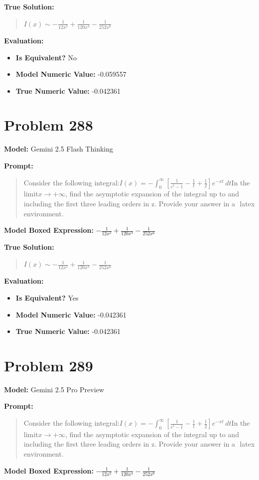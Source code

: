\documentclass{article}
\begin{document}
{\textbf{True Solution:}
\begin{quote}
$I(x) \sim -\frac{1}{12x^2} + \frac{1}{120x^4} - \frac{1}{252x^6}$
\end{quote}

\textbf{Evaluation:}
\begin{itemize}
\item \textbf{Is Equivalent?} No
\item \textbf{Model Numeric Value:} -0.059557
\item \textbf{True Numeric Value:} -0.042361
\end{itemize}
\vspace{1cm}
\section*{Problem 288}
\textbf{Model:} Gemini 2.5 Flash Thinking

\textbf{Prompt:}
\begin{quote}
Consider the following integral:$I(x) = -\int_{0}^{\infty} \left[ \frac{1}{e^t - 1} - \frac{1}{t} + \frac{1}{2} \right] e^{-xt} \, dt$In the limit$x \to +\infty$, find the asymptotic expansion of the integral up to and including the first three leading orders in z. Provide your answer in a $\boxed{}$ latex environment.
\end{quote}
\textbf{Model Boxed Expression:} $-\frac{1}{12x^2} + \frac{1}{120x^4} - \frac{1}{252x^6}$

\textbf{True Solution:}
\begin{quote}
$I(x) \sim -\frac{1}{12x^2} + \frac{1}{120x^4} - \frac{1}{252x^6}$
\end{quote}

\textbf{Evaluation:}
\begin{itemize}
\item \textbf{Is Equivalent?} Yes
\item \textbf{Model Numeric Value:} -0.042361
\item \textbf{True Numeric Value:} -0.042361
\end{itemize}
\vspace{1cm}
\section*{Problem 289}
\textbf{Model:} Gemini 2.5 Pro Preview

\textbf{Prompt:}
\begin{quote}
Consider the following integral:$I(x) = -\int_{0}^{\infty} \left[ \frac{1}{e^t - 1} - \frac{1}{t} + \frac{1}{2} \right] e^{-xt} \, dt$In the limit$x \to +\infty$, find the asymptotic expansion of the integral up to and including the first three leading orders in z. Provide your answer in a $\boxed{}$ latex environment.
\end{quote}
\textbf{Model Boxed Expression:} $-\frac{1}{12x^2} + \frac{1}{120x^4} - \frac{1}{252x^6}$

}
\end{document}
